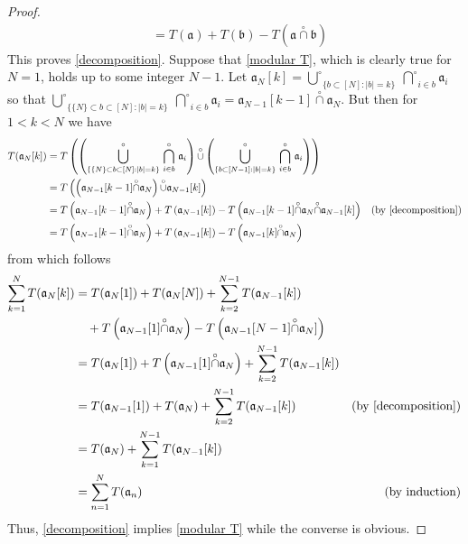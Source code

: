 \documentclass[11pt]{amsart}
\theoremstyle{plain}
\begin{document}
\begin{proof}
\begin{align}
\nonumber
&=
T({\mathfrak a})+T({\mathfrak b})-T({\mathfrak a}{\overset\circ\cap}{\mathfrak b})
\end{align}
This proves \eqref{decomposition}. Suppose that \eqref{modular T}, which is clearly true
for $N=1$, holds up to some integer $N-1$. Let
$
{\mathfrak a}_N[k]
=
{\overset\circ\bigcup}_{\{b\subset[N]:{\vert b\vert}=k\}}\ {\overset\circ\bigcap}_{i\in b}{\mathfrak a}_i
$
so that 
$
{\overset\circ\bigcup}_{\{\{N\}\subset b\subset[N]:{\vert b\vert}=k\}}\ {\overset\circ\bigcap}_{i\in b}{\mathfrak a}_i
=
{\mathfrak a}_{N-1}[k-1]{\overset\circ\cap}{\mathfrak a}_N
$.
But then for $1<k<N$ we have
\begin{align*}
T({\mathfrak a}_N[k])
&=
T
\left(\left(\underset{\{\{N\}\subset b\subset[N]:{\vert b\vert}=k\}}{\overset\circ\bigcup}\  \underset{i\in b}{\overset\circ\bigcap}\ {\mathfrak a}_i\right){\overset\circ\cup}\left(\underset{\{b\subset[N-1]:{\vert b\vert}=k\}}{\overset\circ\bigcup}\ \underset{i\in b}{\overset\circ\bigcap}\ {\mathfrak a}_i\right)\right)\\
&=
T\left(\left({\mathfrak a}_{N-1}[k-1]{\overset\circ\cap}{\mathfrak a}_N\right){\overset\circ\cup}{\mathfrak a}_{N-1}[k]\right)\\
&=
T\left({\mathfrak a}_{N-1}[k-1]{\overset\circ\cap}{\mathfrak a}_N\right)
+T\left({\mathfrak a}_{N-1}[k]\right)
-T\left({\mathfrak a}_{N-1}[k-1]{\overset\circ\cap}{\mathfrak a}_N{\overset\circ\cap}{\mathfrak a}_{N-1}[k]\right)
&(\text{by }\eqref{decomposition})
\\
&=
T\left({\mathfrak a}_{N-1}[k-1]{\overset\circ\cap}{\mathfrak a}_N\right)
+T\left({\mathfrak a}_{N-1}[k]\right)
-T\left({\mathfrak a}_{N-1}[k]{\overset\circ\cap}{\mathfrak a}_N\right)
\end{align*}
from which follows
\begin{align*}
\sum_{k=1}^NT({\mathfrak a}_N[k])
&=
T({\mathfrak a}_N[1])+T({\mathfrak a}_N[N])
+\sum_{k=2}^{N-1}T({\mathfrak a}_{N-1}[k])\\
&\quad+T\left({\mathfrak a}_{N-1}[1]{\overset\circ\cap}{\mathfrak a}_N\right)
-T\left({\mathfrak a}_{N-1}[N-1]{\overset\circ\cap}{\mathfrak a}_N]\right)\\
&=
T({\mathfrak a}_N[1])
+T\left({\mathfrak a}_{N-1}[1]{\overset\circ\cap}{\mathfrak a}_N\right)
+\sum_{k=2}^{N-1}T({\mathfrak a}_{N-1}[k])\\
&=
T({\mathfrak a}_{N-1}[1])+T({\mathfrak a}_N)
+\sum_{k=2}^{N-1}T({\mathfrak a}_{N-1}[k])
&(\text{by }\eqref{decomposition})\\
&=
T({\mathfrak a}_N)+\sum_{k=1}^{N-1}T({\mathfrak a}_{N-1}[k])\\
&=
\sum_{n=1}^NT({\mathfrak a}_n)
&(\text{by induction})
\end{align*}
Thus, \eqref{decomposition} implies \eqref{modular T} while the converse is obvious.


\end{proof}
\end{document}
